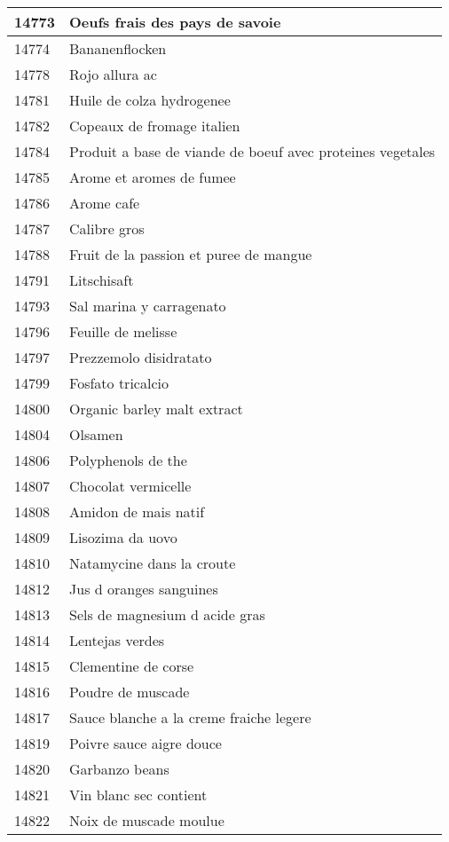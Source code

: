 \begin{longtable}{|l|l|}
14773 & Oeufs frais des pays de savoie \\ \hline 
14774 & Bananenflocken \\ \hline 
14778 & Rojo allura ac \\ \hline 
14781 & Huile de colza hydrogenee \\ \hline 
14782 & Copeaux de fromage italien \\ \hline 
14784 & Produit a base de viande de boeuf avec proteines vegetales \\ \hline 
14785 & Arome et aromes de fumee \\ \hline 
14786 & Arome cafe \\ \hline 
14787 & Calibre gros \\ \hline 
14788 & Fruit de la passion et puree de mangue \\ \hline 
14791 & Litschisaft \\ \hline 
14793 & Sal marina y carragenato \\ \hline 
14796 & Feuille de melisse \\ \hline 
14797 & Prezzemolo disidratato \\ \hline 
14799 & Fosfato tricalcio \\ \hline 
14800 & Organic barley malt extract \\ \hline 
14804 & Olsamen \\ \hline 
14806 & Polyphenols de the \\ \hline 
14807 & Chocolat vermicelle \\ \hline 
14808 & Amidon de mais natif \\ \hline 
14809 & Lisozima da uovo \\ \hline 
14810 & Natamycine dans la croute \\ \hline 
14812 & Jus d oranges sanguines \\ \hline 
14813 & Sels de magnesium d acide gras \\ \hline 
14814 & Lentejas verdes \\ \hline 
14815 & Clementine de corse \\ \hline 
14816 & Poudre de muscade \\ \hline 
14817 & Sauce blanche a la creme fraiche legere \\ \hline 
14819 & Poivre sauce aigre douce \\ \hline 
14820 & Garbanzo beans \\ \hline 
14821 & Vin blanc sec contient \\ \hline 
14822 & Noix de muscade moulue \\ \hline 

\end{longtable}
